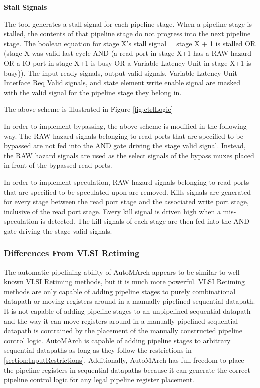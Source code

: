 {\bf Stall Signals}

The tool generates a stall signal for each pipeline stage. When a pipeline stage is stalled, the contents of that pipeline stage do not progress into the next pipeline stage. The boolean equation for stage X's stall signal = stage X + 1 is stalled OR (stage X was valid last cycle AND (a read port in stage X+1 has a RAW hazard OR a IO port in stage X+1 is busy OR a Variable Latency Unit in stage X+1 is busy)). The input ready signals, output valid signals, Variable Latency Unit Interface Req Valid signals, and state element write enable signal are masked with the valid signal for the pipeline stage they belong in. 

The above scheme is illustrated in Figure \ref{fig:ctrlLogic}

In order to implement bypassing, the above scheme is modified in the following way. The RAW hazard signals belonging to read ports that are specified to be bypassed are not fed into the AND gate driving the stage valid signal. Instead, the RAW hazard signals are used as the select signals of the bypass muxes placed in front of the bypassed read ports.

In order to implement speculation, RAW hazard signals belonging to read ports that are specified to be speculated upon are removed. Kills signals are generated for every stage between the read port stage and the associated write port stage, inclusive of the read port stage. Every kill signal is driven high when a mis-speculation is detected. The kill signals of each stage are then fed into the AND gate driving the stage valid signals.

\subsubsection{Differences From VLSI Retiming}
The automatic pipelining ability of AutoMArch appears to be similar to well known VLSI Retiming methods, but it is much more powerful. VLSI Retiming methods are only capable of adding pipeline stages to purely combinational datapath or moving registers around in a manually pipelined sequential datapath. It is not capable of adding pipeline stages to an unpipelined sequential datapath and the way it can move registers around in a manually pipelined sequential datapath is contrained by the placement of the manually constructed pipeline control logic. AutoMArch is capable of adding pipeline stages to arbitrary sequential datapaths as long as they follow the restrictions in \ref{section:InputRestrictions}. Additionally, AutoMArch has full freedom to place the pipeline registers in sequential datapaths because it can generate the correct pipeline control logic for any legal pipeline register placement.


